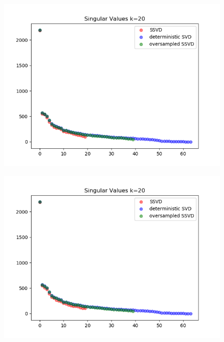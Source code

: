 \documentclass[paper=a4, fontsize=11pt]{scrartcl} %
\numberwithin{figure}{section} %
\numberwithin{table}{section} %
\begin{document}
\begin{figure}[H]

\includegraphics{sing_values_5.png}
\end{figure}

\begin{figure}[H]

\includegraphics{sing_values_6.png}
\end{figure}
\end{document}

